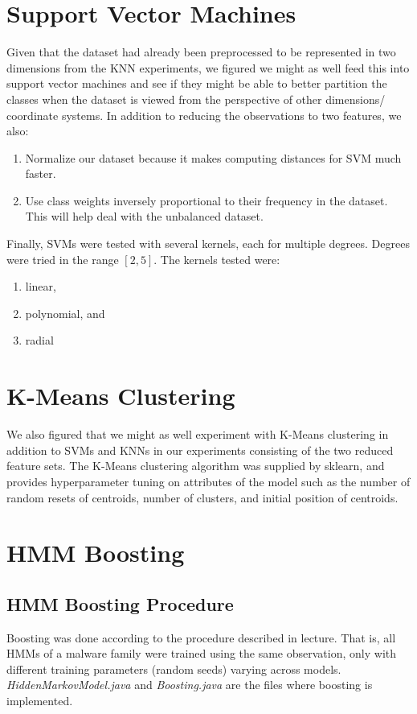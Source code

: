 \documentclass[12pt]{article}
\begin{document}
  \section{Support Vector Machines}
  Given that the dataset had already been preprocessed to be represented in two dimensions from the KNN experiments, we figured we might as well feed this into support vector machines and see if they might be able to better partition the classes when the dataset is viewed from the perspective of other dimensions/ coordinate systems. In addition to reducing the observations to two features, we also:
\begin{enumerate}
  \item Normalize our dataset because it makes computing distances for SVM much faster.
  \item Use class weights inversely proportional to their frequency in the dataset. This will help deal with the unbalanced dataset.
\end{enumerate}
  Finally, SVMs were tested with several kernels, each for multiple degrees. Degrees were tried in the range $[2, 5]$. 
  The kernels tested were:
  \begin{enumerate}
    \item linear,
    \item polynomial, and
    \item radial
  \end{enumerate}

  \section{K-Means Clustering}
  We also figured that we might as well experiment with K-Means clustering in addition to SVMs and KNNs in our experiments consisting of the two reduced feature sets. The K-Means clustering algorithm was supplied by sklearn, and provides hyperparameter tuning on attributes of the model such as the number of random resets of centroids, number of clusters, and initial position of centroids.




\section{HMM Boosting}
  \subsection{HMM Boosting Procedure}
  Boosting was done according to the procedure described in lecture. That is, all HMMs of a malware family were trained using the same observation, only with different training parameters (random seeds) varying across models. \textit{HiddenMarkovModel.java} and \textit{Boosting.java} are the files where boosting is implemented.
 
\end{document}
